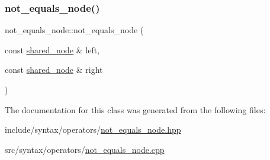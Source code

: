 \subsubsection{\texorpdfstring{not\+\_\+equals\+\_\+node()}{not\_equals\_node()}}
{\footnotesize\ttfamily not\+\_\+equals\+\_\+node\+::not\+\_\+equals\+\_\+node (\begin{DoxyParamCaption}\item[{const \hyperlink{namespacejawe_a3f307481d921b6cbb50cc8511fc2b544}{shared\+\_\+node} \&}]{left,  }\item[{const \hyperlink{namespacejawe_a3f307481d921b6cbb50cc8511fc2b544}{shared\+\_\+node} \&}]{right }\end{DoxyParamCaption})}



The documentation for this class was generated from the following files\+:\begin{DoxyCompactItemize}
\item 
include/syntax/operators/\hyperlink{not__equals__node_8hpp}{not\+\_\+equals\+\_\+node.\+hpp}\item 
src/syntax/operators/\hyperlink{not__equals__node_8cpp}{not\+\_\+equals\+\_\+node.\+cpp}\end{DoxyCompactItemize}
